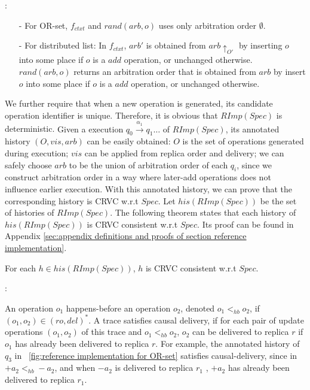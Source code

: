 
:

\begin{itemize}
\setlength{\itemsep}{0.5pt}
\item[-] {\color {red}For OR-set, $f_{\mathit{ctxt}}$ and $\mathit{rand}(\mathit{arb},o)$ uses only arbitration order $\emptyset$.} 

\item[-] For distributed list: In $f_{\mathit{ctxt}}$, $\mathit{arb}'$ is obtained from $\mathit{arb} \uparrow_{O'}$ by inserting $o$ into some place if $o$ is a $add$ operation, or unchanged otherwise. $\mathit{rand}(\mathit{arb},o)$ returns an arbitration order that is obtained from $\mathit{arb}$ by insert $o$ into some place if $o$ is a $add$ operation, or unchanged otherwise.
\end{itemize}


We further require that when a new operation is generated, its candidate operation identifier is unique. Therefore, it is obvious that $\mathit{RImp}(\mathit{Spec})$ is deterministic. {\color {red}Given a execution $q_0 {\xrightarrow{\alpha_1}} q_1 \ldots$ of $\mathit{RImp}(\mathit{Spec})$, its annotated history $(O,\mathit{vis},\mathit{arb})$ can be easily obtained: $O$ is the set of operations generated during execution; $\mathit{vis}$ can be applied from replica order and delivery; we can safely choose $\mathit{arb}$ to be the union of arbitration order of each $q_i$, since we construct arbitration order in a way where later-add operations does not influence earlier execution. With this annotated history, we can prove that the corresponding history is CRVC w.r.t $\mathit{Spec}$. Let $\mathit{his}(\mathit{RImp}(\mathit{Spec}))$ be the set of histories of $\mathit{RImp}(\mathit{Spec})$. The following theorem states that each history of $\mathit{his}(\mathit{RImp}(\mathit{Spec}))$ is CRVC consistent w.r.t $\mathit{Spec}$.} Its proof can be found in Appendix \ref{sec:appendix definitions and proofs of section reference implementation}.

\begin{theorem}
\label{theorem:histories of reference implementation are SRV consistent}
For each $h \in \mathit{his}(\mathit{RImp}(\mathit{Spec}))$, $h$ is CRVC consistent w.r.t $\mathit{Spec}$. 
\end{theorem}


:

An operation $o_1$ happens-before \cite{Lamport:1978} an operation $o_2$, denoted $o_1 <_{\mathit{hb}} o_2$, if $(o_1,o_2) \in (\mathit{ro},\mathit{del})^*$. A trace satisfies causal delivery, if for each pair of update operations $(o_1,o_2)$ of this trace and $o_1 <_{\mathit{hb}} o_2$, $o_2$ can be delivered to replica $r$ if $o_1$ has already been delivered to replica $r$. {\color {red}For example, the annotated history of $q_3$ in \figurename~\ref{fig:reference implementation for OR-set} satisfies causal-delivery, since in $+a_2 <_{\mathit{hb}} -a_2$, and when $-a_2$ is delivered to replica $r_1$ , $+a_2$ has already been delivered to replica $r_1$.}


